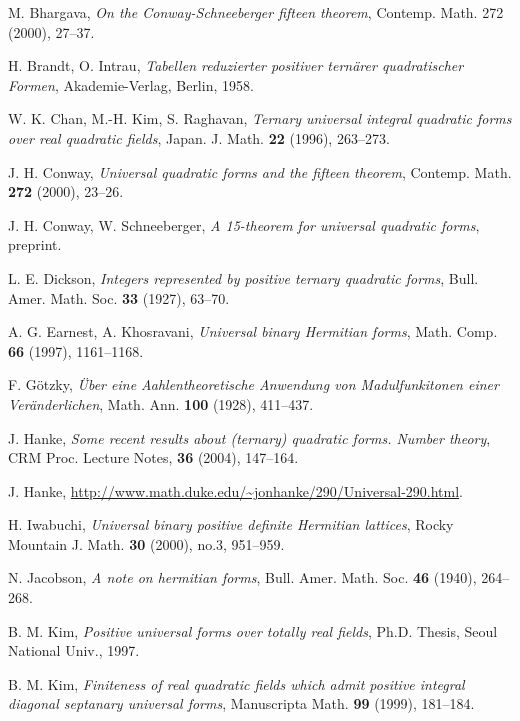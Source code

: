 \documentclass[a4paper,10pt,reqno]{amsart}
\begin{document}
\begin{thebibliography}{12}
  M. Bhargava,
  \newblock \emph{On the Conway-Schneeberger fifteen theorem},
  \newblock Contemp. Math. 272 (2000), 27--37.

H. Brandt, O. Intrau, \emph{Tabellen reduzierter positiver
tern\"{a}rer quadratischer Formen}, Akademie-Verlag, Berlin, 1958.

W. K. Chan, M.-H. Kim, S. Raghavan, \emph{Ternary universal integral
quadratic forms over real quadratic fields}, Japan. J. Math. {\bf
22} (1996), 263--273.

J. H. Conway, \emph{Universal quadratic forms and the fifteen
theorem}, Contemp. Math. {\bf 272} (2000), 23--26.

J. H. Conway, W. Schneeberger, \emph{A 15-theorem for universal
quadratic forms}, preprint.

L. E. Dickson, \emph{Integers represented by positive ternary
quadratic forms}, Bull. Amer. Math. Soc. {\bf 33} (1927), 63--70.

  A. G. Earnest, A. Khosravani,
  \newblock \emph{Universal binary Hermitian forms},
  \newblock Math. Comp. {\bf 66} (1997), 1161--1168.

F. G\"{o}tzky, \emph{\"{U}ber eine Aahlentheoretische Anwendung von
Madulfunkitonen einer Ver\"{a}nderlichen}, Math. Ann. {\bf 100}
(1928), 411--437.

J. Hanke, \emph{Some recent results about (ternary) quadratic forms.
Number theory}, CRM Proc. Lecture Notes, {\bf 36} (2004), 147--164.

J. Hanke, \url{http://www.math.duke.edu/~jonhanke/290/Universal-290.html}.

  H. Iwabuchi,
  \newblock \emph{Universal binary positive definite Hermitian lattices},
  \newblock Rocky Mountain J. Math. {\bf 30} (2000), no.3, 951--959.

  N. Jacobson,
  \newblock \emph{A note on hermitian forms},
  \newblock Bull. Amer. Math. Soc. {\bf 46} (1940), 264--268.

B. M. Kim, \emph{Positive universal forms over totally real
fields}, Ph.D. Thesis, Seoul National Univ., 1997.

B. M. Kim, \emph{Finiteness of real quadratic fields which admit
positive integral diagonal septanary universal forms}, Manuscripta
Math. {\bf 99} (1999), 181--184.


\end{thebibliography}
\end{document}

